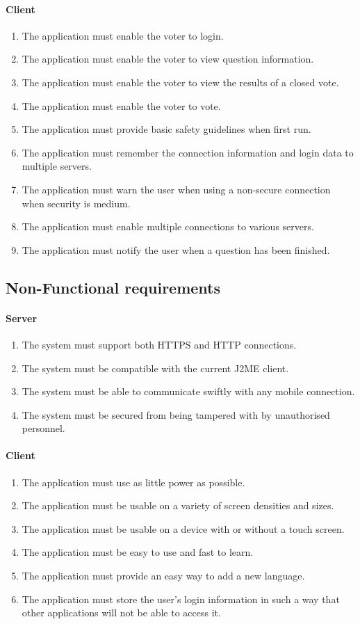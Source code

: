 \documentclass[11pt,twoside,a4paper]{book}
\begin{document}
\paragraph*{Client}
\begin{enumerate}
\item The application must enable the voter to login. 
\item The application must enable the voter to view question information.
\item The application must enable the voter to view the results of a closed vote. 
\item The application must enable the voter to vote.
\item The application must provide basic safety guidelines when first run.
\item The application must remember the connection information and login data to multiple servers.
\item The application must warn the user when using a non-secure connection when security is medium.
\item The application must enable multiple connections to various servers.
\item The application must notify the user when a question has been finished.
\end{enumerate}
\subsection{Non-Functional requirements}
\paragraph*{Server}
\begin{enumerate}
\item  The system must support both HTTPS and HTTP connections.
\item The system must be compatible with the current J2ME client.
\item The system must be able to communicate swiftly with any mobile connection.
\item The system must be secured from being tampered with by unauthorised personnel.
\end{enumerate}
\paragraph*{Client}
\begin{enumerate}
\item The application must use as little power as possible.
\item The application must be usable on a variety of screen densities and sizes.
\item The application must be usable on a device with or without a touch screen.
\item The application must be easy to use and fast to learn.
\item The application must provide an easy way to add a new language.
\item The application must store the user's login information in such a way that other applications will not be able to access it.
\end{enumerate}
\end{document}

